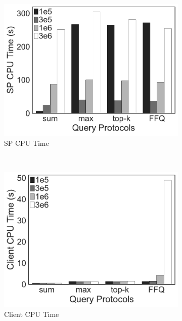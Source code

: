 \begin{figure}[t]
  \centering
  \begin{subfigure}[b]{.33\linewidth}
    \centering
    \includegraphics[width=\linewidth]{exp-figs/aggregate-queries/cardinality_sp.pdf}
    \caption{SP CPU Time}
  \end{subfigure}~%
  \begin{subfigure}[b]{.33\linewidth}
    \centering
    \includegraphics[width=\linewidth]{exp-figs/aggregate-queries/cardinality_client.pdf}
    \caption{Client CPU Time}
  \end{subfigure}~%
  \begin{subfigure}[b]{.33\linewidth}
    \centering

\end{subfigure}
\end{figure}

